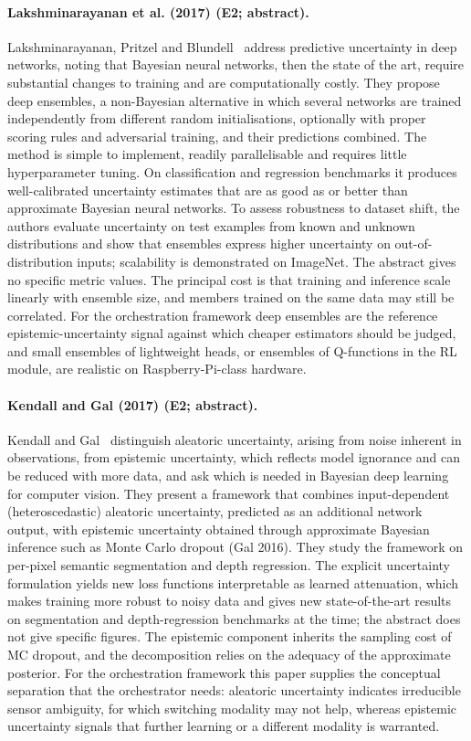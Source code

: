 \documentclass[10pt,a4paper]{article}
\begin{document}
\paragraph{Lakshminarayanan et al. (2017) (E2; abstract).} Lakshminarayanan, Pritzel and Blundell~\cite{Lakshminarayanan2017} address predictive uncertainty in deep networks, noting that Bayesian neural networks, then the state of the art, require substantial changes to training and are computationally costly. They propose deep ensembles, a non-Bayesian alternative in which several networks are trained independently from different random initialisations, optionally with proper scoring rules and adversarial training, and their predictions combined. The method is simple to implement, readily parallelisable and requires little hyperparameter tuning. On classification and regression benchmarks it produces well-calibrated uncertainty estimates that are as good as or better than approximate Bayesian neural networks. To assess robustness to dataset shift, the authors evaluate uncertainty on test examples from known and unknown distributions and show that ensembles express higher uncertainty on out-of-distribution inputs; scalability is demonstrated on ImageNet. The abstract gives no specific metric values. The principal cost is that training and inference scale linearly with ensemble size, and members trained on the same data may still be correlated. For the orchestration framework deep ensembles are the reference epistemic-uncertainty signal against which cheaper estimators should be judged, and small ensembles of lightweight heads, or ensembles of Q-functions in the RL module, are realistic on Raspberry-Pi-class hardware.

\paragraph{Kendall and Gal (2017) (E2; abstract).} Kendall and Gal~\cite{Kendall2017} distinguish aleatoric uncertainty, arising from noise inherent in observations, from epistemic uncertainty, which reflects model ignorance and can be reduced with more data, and ask which is needed in Bayesian deep learning for computer vision. They present a framework that combines input-dependent (heteroscedastic) aleatoric uncertainty, predicted as an additional network output, with epistemic uncertainty obtained through approximate Bayesian inference such as Monte Carlo dropout (Gal 2016). They study the framework on per-pixel semantic segmentation and depth regression. The explicit uncertainty formulation yields new loss functions interpretable as learned attenuation, which makes training more robust to noisy data and gives new state-of-the-art results on segmentation and depth-regression benchmarks at the time; the abstract does not give specific figures. The epistemic component inherits the sampling cost of MC dropout, and the decomposition relies on the adequacy of the approximate posterior. For the orchestration framework this paper supplies the conceptual separation that the orchestrator needs: aleatoric uncertainty indicates irreducible sensor ambiguity, for which switching modality may not help, whereas epistemic uncertainty signals that further learning or a different modality is warranted.
\end{document}
